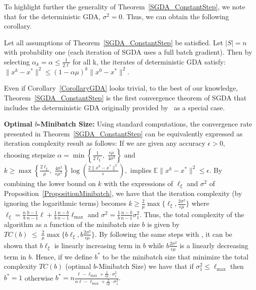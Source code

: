 \documentclass{article}
\begin{document}
To highlight further the generality of Theorem~\ref{SGDA_ConstantStep}, we note that for the deterministic GDA, $\sigma^2=0$. Thus, we can obtain the following corollary.
\begin{corollary}
\label{CorollaryGDA}
Let all assumptions of Theorem~\ref{SGDA_ConstantStep} be satisfied. Let $|S|=n$ with probability one (each iteration of SGDA uses a full batch gradient). Then by selecting $\alpha_k=\alpha \leq \frac{1}{2\ell}$ for all k, the iterates of deterministic GDA satisfy: $ \|x^{k}-x^*\|^2 \leq \left(1-\alpha \mu \right)^k \|x^0-x^*\|^2$.
\end{corollary}
Even if Corollary~\ref{CorollaryGDA} looks trivial, to the best of our knowledge, Theorem~\ref{SGDA_ConstantStep} is the first convergence theorem of SGDA that includes the deterministic GDA originally provided by~\citet{chen1997convergence} as a special case.   

\textbf{Optimal $b$-Minibatch Size:} Using standard computations, the convergence rate presented in Theorem~\ref{SGDA_ConstantStep} can be equivalently expressed as iteration complexity result as follows: If we are given any accuracy $\epsilon>0$, choosing stepsize $\alpha  = \min \left\{ \frac{1}{2\ell_\xi},\; \frac{\epsilon\mu}{4 \sigma^2}\right\}$ and 
$
k\geq  \max \left\{ \tfrac{2\ell_{\xi}}{\mu },\; \tfrac{4 \sigma^2}{\epsilon\mu^2}\right\} \log\left(\tfrac{ 2 \|x^0 - x^*\|^2 }{  \epsilon }\right),
$
implies $\mathbb{E} \| x^k - x^* \|^2  \leq \epsilon.$ By combining the lower bound on $k$ with the expressions of $\ell_\xi$ and $\sigma^2$ of Proposition~\ref{PropositionMinibatch}, we have that the iteration complexity (by ignoring the logarithmic terms) becomes $k\geq \frac{2}{\mu} \max\{\ell_\xi, \frac{2\sigma^2}{\epsilon \mu} \}$ where $\ell_\xi = \frac{n}{b}\frac{b-1}{n-1}\ell+\frac{1}{b}\frac{n-b}{n-1} \ell_{\max} $ and $\sigma^2 =\frac{1}{b} \frac{n-b}{n-1} \sigma_1^2$. Thus, the total complexity of the algorithm as a function of the minibatch size $b$ is given by $TC(b)\; \leq \; \frac{2}{\mu} \max\{b \ell_\xi, b \frac{2\sigma^2}{\epsilon \mu} \}$.
By following the same steps with \cite{gower2019sgd}, it can be shown that $b \ell_\xi$ is linearly increasing term in $b$ while  $b\frac{2\sigma^2}{\epsilon \mu}$ is a linearly decreasing term in $b$. Hence, if we define $b^*$ to be the minibatch size that minimize the total complexity $TC(b)$ (optimal $b$-Minibatch Size) we have that if $\sigma_1^2\leq \ell_{\max}$ then $b^*=1$ otherwise $b^* = n \frac{\ell  - \ell_{\max} +\frac{2}{\epsilon \mu} \cdot  \sigma_1^2}{n\ell  - \ell_{\max} +\frac{2}{\epsilon \mu} \cdot \sigma_1^2}.$
\end{document}
